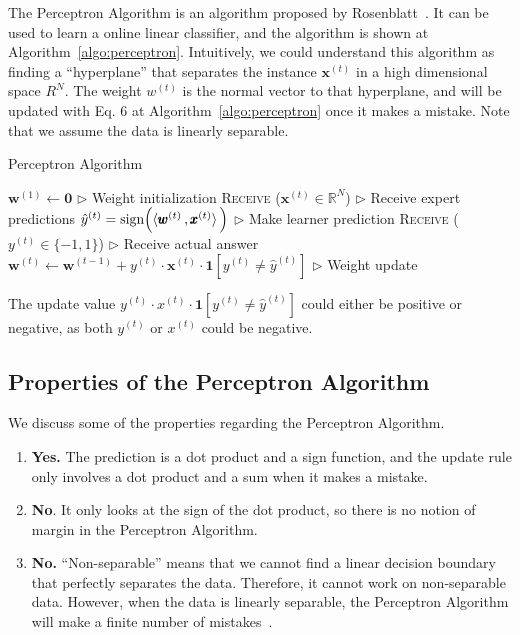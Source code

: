 \documentclass[11pt]{article}
\begin{document}
The Perceptron Algorithm is an algorithm proposed by Rosenblatt~\cite{rosenblatt1958perceptron}. It can be used to learn a online linear classifier, and the algorithm is shown at Algorithm~\ref{algo:perceptron}. Intuitively, we could understand this algorithm as finding a ``hyperplane'' that separates the instance $\mathbf{x}^{(t)}$ in a high dimensional space $R^{N}$. The weight $w^{(t)}$ is the normal vector to that hyperplane, and will be updated with Eq. 6 at Algorithm~\ref{algo:perceptron} once it makes a mistake. Note that we assume the data is linearly separable. %

\begin{algorithm}[H]
\caption{Perceptron Algorithm}
\label{algo:perceptron}
\begin{algorithmic}[1]
\STATE $\pmb{w}^{(1)} \leftarrow \mathbf{0}$ \hfill $\triangleright$ Weight initialization
\STATE \textsc{Receive} ($\pmb{x}^{(t)}\in \mathbb{R}^N$) \hfill $\triangleright$ Receive expert predictions
\STATE $\hat{y}^{(t)} = \text{sign}\Big( \langle  \pmb{w}^{(t)}  \, , \pmb{x}^{(t)}  \rangle\, \Big)$ \hfill $\triangleright$ Make learner prediction
\STATE \textsc{Receive} ($y^{(t)}\in\{-1, 1\}$) \hfill $\triangleright$ Receive actual answer
\STATE $\pmb{w}^{(t)}\leftarrow \pmb{w}^{(t-1)} + y^{(t)} \cdot \pmb{x}^{(t)} \cdot \pmb{1}[y^{(t)}\neq \hat{y}^{(t)}] $ \hfill $\triangleright$ Weight update
\ENDFOR
\end{algorithmic}
\end{algorithm}

The update value $y^{(t)} \cdot x^{(t)} \cdot\textbf{1}[y^{(t)}\neq \hat{y}^{(t)}]$ could either be positive or negative, as both $y^{(t)}$ or $x^{(t)}$ could be negative.

\subsection{Properties of the Perceptron Algorithm}
We discuss some of the properties regarding the Perceptron Algorithm.

\begin{enumerate}
    \item \textit{{\color{blue}{Is it fast?}}} \textbf{Yes.} The prediction is a dot product and a sign function, and the update rule only involves a dot product and a sum when it makes a mistake.
    \item \textit{{\color{blue}{Is it a Large Margin classifier?}}} \textbf{No}. It only looks at the sign of the dot product, so there is no notion of margin in the Perceptron Algorithm.
    \item \textit{{\color{blue}{Does it work on non-separable data?}}}  \textbf{No.} ``Non-separable'' means that we cannot find a linear decision boundary that perfectly separates the data. Therefore, it cannot work on non-separable data. However, when the data is linearly separable, the Perceptron Algorithm will make a finite number of mistakes~\cite{novikoff1963convergence}.
\end{enumerate}
\end{document}
